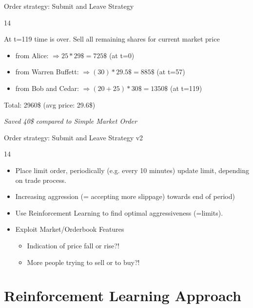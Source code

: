 \documentclass[10pt]{beamer}
\begin{document}
\begin{frame}[fragile]{Order strategy: Submit and Leave Strategy}
\begin{overlayarea}{\textwidth}{14\baselineskip}
{At t=119 time is over. Sell all remaining shares for current market price

\begin{itemize}
\item from Alice:   $\Rightarrow 25*29\$ = 725\$$  (at t=0)
\item from Warren Buffett:   $\Rightarrow (30)*29.5\$ = 885\$$  (at t=57)
\item from Bob and Cedar:   $\Rightarrow (20+25)*30\$ = 1350\$$   (at t=119)
\end{itemize}
Total: 2960\$ (avg price: 29.6\$)

\emph{Saved 40\$ compared to Simple Market Order}}

\end{overlayarea}
\end{frame}


\begin{frame}[fragile]{Order strategy: Submit and Leave Strategy v2}
\begin{overlayarea}{\textwidth}{14\baselineskip}

\begin{itemize}
\item Place limit order, periodically (e.g. every 10 minutes) update limit, depending on trade process.
\item Increasing aggression (= accepting more slippage) towards end of period)
\item Use Reinforcement Learning to find optimal aggressiveness (=limits).
\item Exploit Market/Orderbook Features
\begin{itemize}
\item Indication of price fall or rise?!
\item More people trying to sell or to buy?!
\end{itemize}
\end{itemize}



\end{overlayarea}
\end{frame}

\section{Reinforcement Learning Approach}
\end{document}
